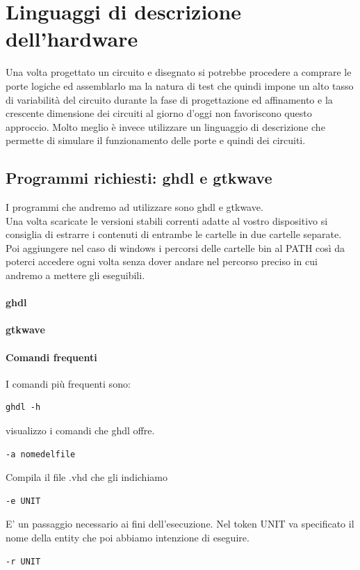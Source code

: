\documentclass[a4paper]{book}
\begin{document}
\chapter{Linguaggi di descrizione dell'hardware}

Una volta progettato un circuito e disegnato si potrebbe procedere a comprare le porte logiche ed assemblarlo ma la natura di test che quindi impone un alto tasso di variabilità del circuito durante la fase di progettazione ed affinamento e la crescente dimensione dei circuiti al giorno d'oggi non favoriscono questo approccio.
Molto meglio è invece utilizzare un linguaggio di descrizione che permette di simulare il funzionamento delle porte e quindi dei circuiti.


\section{Programmi richiesti: ghdl e gtkwave}

I programmi che andremo ad utilizzare sono ghdl e gtkwave.\\
Una volta scaricate le versioni stabili correnti adatte al vostro dispositivo si consiglia di estrarre i contenuti di entrambe le cartelle in due cartelle separate.\\
Poi aggiungere nel caso di windows i percorsi delle cartelle bin al PATH così da poterci accedere ogni volta senza dover andare nel percorso preciso in cui andremo a mettere gli eseguibili.

\subsubsection{ghdl}
\subsubsection{gtkwave}
\subsubsection{Comandi frequenti}

I comandi più frequenti sono:

\begin{verbatim}ghdl -h \end{verbatim}visualizzo i comandi che ghdl offre.

\begin{verbatim}
-a nomedelfile
\end{verbatim}
Compila il file .vhd che gli indichiamo
\begin{verbatim}
-e UNIT
\end{verbatim}
E' un passaggio necessario ai fini dell'esecuzione. Nel token UNIT va specificato il nome della entity che poi abbiamo intenzione di eseguire.
\begin{verbatim}
-r UNIT
\end{verbatim}
\end{document}
